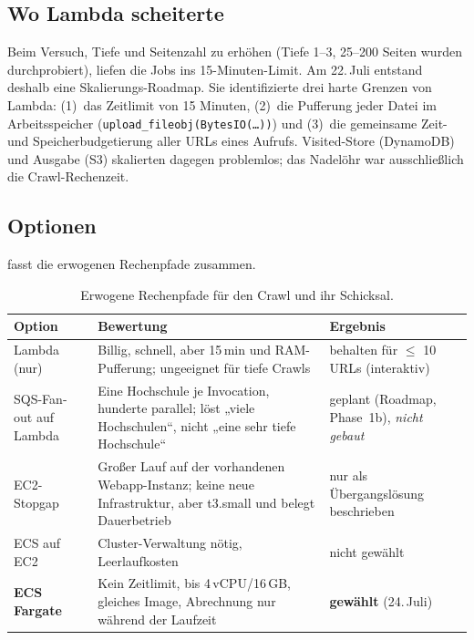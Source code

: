 \subsection{Wo Lambda scheiterte}
Beim Versuch, Tiefe und Seitenzahl zu erhöhen (Tiefe 1--3, 25--200 Seiten wurden durchprobiert), liefen die Jobs ins 15-Minuten-Limit. Am 22.\,Juli entstand deshalb eine Skalierungs-Roadmap. Sie identifizierte drei harte Grenzen von Lambda: (1)~das Zeitlimit von 15 Minuten, (2)~die Pufferung jeder Datei im Arbeitsspeicher (\texttt{upload\_fileobj(BytesIO(\ldots))}) und (3)~die gemeinsame Zeit- und Speicherbudgetierung aller URLs eines Aufrufs. Visited-Store (DynamoDB) und Ausgabe (S3) skalierten dagegen problemlos; das Nadelöhr war ausschließlich die Crawl-Rechenzeit.

\subsection{Optionen}
 fasst die erwogenen Rechenpfade zusammen.

\begin{table}[htbp]
\centering\small
\caption{Erwogene Rechenpfade für den Crawl und ihr Schicksal.}\label{tab:compute-optionen}
\begin{tabularx}{\linewidth}{@{}p{3.1cm} X p{3.0cm}@{}}
\toprule
\textbf{Option} & \textbf{Bewertung} & \textbf{Ergebnis} \\
\midrule
Lambda (nur) & Billig, schnell, aber 15\,min und RAM-Pufferung; ungeeignet für tiefe Crawls & behalten für $\le$ 10 URLs (interaktiv) \\
SQS-Fan-out auf Lambda & Eine Hochschule je Invocation, hunderte parallel; löst „viele Hochschulen“, nicht „eine sehr tiefe Hochschule“ & geplant (Roadmap, Phase~1b), \emph{nicht gebaut} \\
EC2-Stopgap & Großer Lauf auf der vorhandenen Webapp-Instanz; keine neue Infrastruktur, aber t3.small und belegt Dauerbetrieb & nur als Übergangslösung beschrieben \\
ECS auf EC2 & Cluster-Verwaltung nötig, Leerlaufkosten & nicht gewählt \\
\textbf{ECS Fargate} & Kein Zeitlimit, bis 4\,vCPU/16\,GB, gleiches Image, Abrechnung nur während der Laufzeit & \textbf{gewählt} (24.\,Juli) \\
\bottomrule
\end{tabularx}
\end{table}

